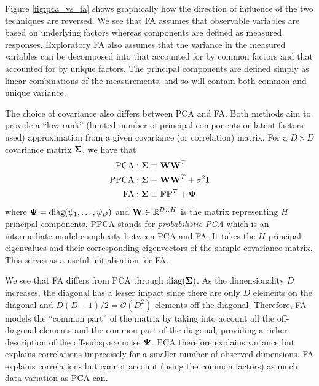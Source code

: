 \documentclass[12pt, letterpaper]{article}
\begin{document}
    Figure \ref{fig:pca_vs_fa} shows graphically how the direction of influence of the two techniques are reversed. We see that FA assumes that observable variables are based on underlying factors whereas components are defined as measured responses. Exploratory FA also assumes that the variance in the measured variables can be decomposed into that accounted for by common factors and that accounted for by unique factors. The principal components are defined simply as linear combinations of the measurements, and so will contain both common and unique variance.


    The choice of covariance also differs between PCA and FA. Both methods aim to provide a ``low-rank'' (limited number of principal components or latent factors used) approximation from a given covariance (or correlation) matrix. For a $D\times D$ covariance matrix $\vb{\Sigma}$, we have that 
    \begin{align*}
        \text{PCA} &: \vb{\Sigma}\equiv \vb{WW}^T \\
        \text{PPCA} &: \vb{\Sigma}\equiv \vb{WW}^T + \sigma^2\vb{I} \\
        \text{FA} &: \vb{\Sigma}\equiv \vb{FF}^T+\vb{\Psi}
    \end{align*}
    where $\vb{\Psi}=\text{diag}(\psi_1,\dots,\psi_D)$ and $\vb{W}\in\mathbb{R}^{D\times H}$ is the matrix representing $H$ principal components. PPCA stands for \emph{probabilistic PCA} which is an intermediate model complexity between PCA and FA. It takes the $H$ principal eigenvalues and their corresponding eigenvectors of the sample covariance matrix. This serves as a useful initialisation for FA.
    
    We see that FA differs from PCA through $\text{diag}(\vb{\Sigma})$. As the dimensionality $D$ increases, the diagonal has a lesser impact since there are only $D$ elements on the diagonal and $D(D-1)/2 = \mathcal{O}(D^2)$ elements off the diagonal. Therefore, FA models the ``common part'' of the matrix by taking into account all the off-diagonal elements and the common part of the diagonal, providing a richer description of the off-subspace noise $\vb{\Psi}$. PCA therefore explains variance but explains correlations imprecisely for a smaller number of observed dimensions. FA explains correlations but cannot account (using the common factors) as much data variation as PCA can.
    
\end{document}
